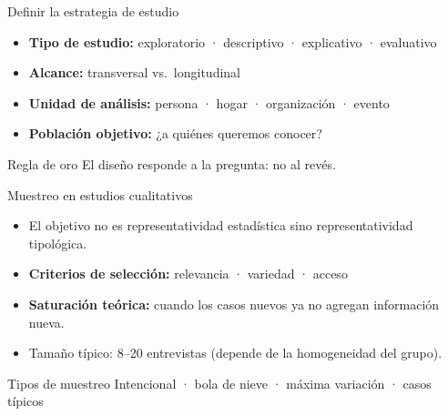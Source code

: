 \documentclass[aspectratio=169, 12pt]{beamer}
\begin{document}
\begin{frame}[plain]
\end{frame}

\begin{frame}{Definir la estrategia de estudio}
  \begin{itemize}
    \item \textbf{Tipo de estudio:} exploratorio · descriptivo · explicativo · evaluativo
    \item \textbf{Alcance:} transversal vs.\ longitudinal
    \item \textbf{Unidad de análisis:} persona · hogar · organización · evento
    \item \textbf{Población objetivo:} ¿a quiénes queremos conocer?
  \end{itemize}
  \vspace{0.3cm}
  \begin{alertblock}{Regla de oro}
    El diseño responde a la pregunta: no al revés.
  \end{alertblock}
\end{frame}

\begin{frame}{Muestreo en estudios cualitativos}
  \begin{itemize}
    \item El objetivo no es representatividad estadística sino \alert{representatividad tipológica}.
    \item \textbf{Criterios de selección:} relevancia · variedad · acceso
    \item \textbf{Saturación teórica:} cuando los casos nuevos ya no agregan información nueva.
    \item Tamaño típico: 8--20 entrevistas (depende de la homogeneidad del grupo).
  \end{itemize}
  \vspace{0.3cm}
  \begin{block}{Tipos de muestreo}
    Intencional · bola de nieve · máxima variación · casos típicos
  \end{block}
\end{frame}
\end{document}
